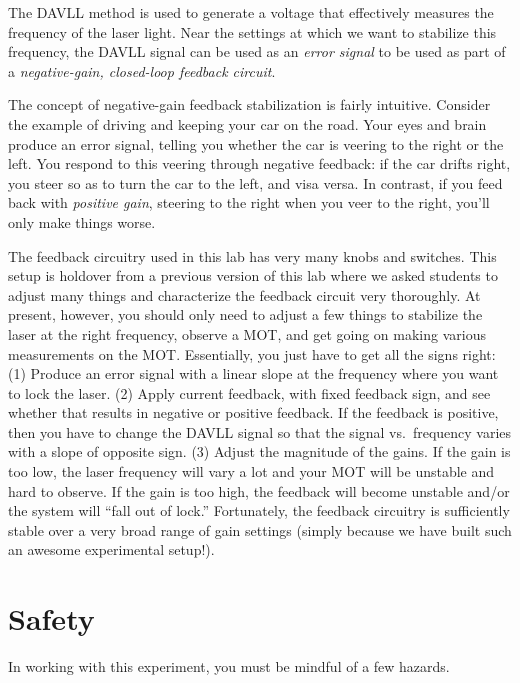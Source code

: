 \documentclass{../lab}
\begin{document}
The DAVLL method is used to generate a voltage that effectively measures the frequency of the laser light.  Near the settings at which we want to stabilize this frequency, the DAVLL signal can be used as an \emph{error signal} to be used as part of a \emph{negative-gain, closed-loop feedback circuit}.

The concept of negative-gain feedback stabilization is fairly intuitive.  Consider the example of driving and keeping your car on the road.  Your eyes and brain produce an error signal, telling you whether the car is veering to the right or the left.  You respond to this veering through negative feedback: if the car drifts right, you steer so as to turn the car to the left, and visa versa.  In contrast, if you feed back with \emph{positive gain}, steering to the right when you veer to the right, you'll only make things worse.

The feedback circuitry used in this lab has very many knobs and switches.  This setup is holdover from a previous version of this lab where we asked students to adjust many things and characterize the feedback circuit very thoroughly.  At present, however, you should only need to adjust a few things to stabilize the laser at the right frequency, observe a MOT, and get going on making various measurements on the MOT.  Essentially, you just have to get all the signs right:  (1) Produce an error signal with a linear slope at the frequency where you want to lock the laser.  (2) Apply current feedback, with fixed feedback sign, and see whether that results in negative or positive feedback.  If the feedback is positive, then you have to change the DAVLL signal so that the signal vs.\ frequency varies with a slope of opposite sign. (3) Adjust the magnitude of the gains.  If the gain is too low, the laser frequency will vary a lot and your MOT will be unstable and hard to observe.  If the gain is too high, the feedback will become unstable and/or the system will ``fall out of lock.''   Fortunately, the feedback circuitry is sufficiently stable over a very broad range of gain settings (simply because we have built such an awesome experimental setup!).

\section{Safety}

In working with this experiment, you must be mindful of a few hazards.
\end{document}
